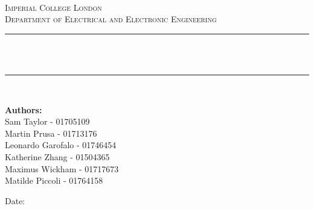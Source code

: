 \begin{titlepage}

\newcommand{\HRule}{\rule{\linewidth}{0.5mm}} %






\begin{center} %

\textsc{\LARGE \reporttype}\\[1.5cm] 
\textsc{\Large Imperial College London}\\[0.5cm] 
\textsc{\large Department of Electrical and Electronic Engineering}\\[0.5cm] 

\HRule \\[0.4cm]
{ \huge \bfseries \reporttitle}\\ %
\HRule \\[1.5cm]
\end{center}

\begin{center}
\textbf{Authors:}\\
Sam Taylor - 01705109\\
Martin Prusa - 01713176\\
Leonardo Garofalo - 01746454\\
Katherine Zhang - 01504365\\
Maximus Wickham - 01717673\\
Matilde Piccoli - 01764158 \\
\end{center}
\vspace{2cm}
\makeatletter
\centering
Date: \@date 

\vfill %



\makeatother


\end{titlepage}

